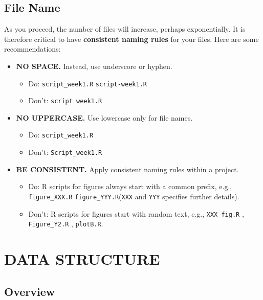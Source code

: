 \documentclass[
]{book}
\providecommand{\tightlist}{%
  \setlength{\itemsep}{0pt}\setlength{\parskip}{0pt}}
\begin{document}
\hypertarget{file-name}{%
\section{File Name}\label{file-name}}

As you proceed, the number of files will increase, perhaps exponentially. It is therefore critical to have \textbf{consistent naming rules} for your files. Here are some recommendations:

\begin{itemize}
\tightlist
\item
  \textbf{NO SPACE.} Instead, use underscore or hyphen.

  \begin{itemize}
  \tightlist
  \item
    Do: \texttt{script\_week1.R} \texttt{script-week1.R}
  \item
    Don't: \texttt{script\ week1.R}
  \end{itemize}
\item
  \textbf{NO UPPERCASE.} Use lowercase only for file names.

  \begin{itemize}
  \tightlist
  \item
    Do: \texttt{script\_week1.R}
  \item
    Don't: \texttt{Script\_week1.R}
  \end{itemize}
\item
  \textbf{BE CONSISTENT.} Apply consistent naming rules within a project.

  \begin{itemize}
  \tightlist
  \item
    Do: R scripts for figures always start with a common prefix, e.g., \texttt{figure\_XXX.R} \texttt{figure\_YYY.R}(\texttt{XXX} and \texttt{YYY} specifies further details).
  \item
    Don't: R scripts for figures start with random text, e.g., \texttt{XXX\_fig.R} , \texttt{Figure\_Y2.R} , \texttt{plotB.R}.
  \end{itemize}
\end{itemize}

\hypertarget{data-structure}{%
\chapter{DATA STRUCTURE}\label{data-structure}}

\hypertarget{overview}{%
\section{Overview}\label{overview}}
\end{document}
